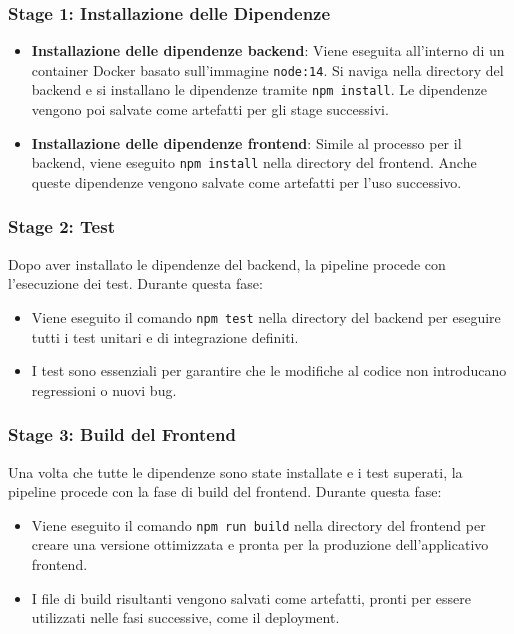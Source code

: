 \documentclass[twoside]{supsistudent}
\begin{document}
\subsubsection{Stage 1: Installazione delle Dipendenze}

\begin{itemize}
  \item \textbf{Installazione delle dipendenze backend}: Viene eseguita all'interno di un container Docker basato sull'immagine \texttt{node:14}. Si naviga nella directory del backend e si installano le dipendenze tramite \texttt{npm install}. Le dipendenze vengono poi salvate come artefatti per gli stage successivi.
  \item \textbf{Installazione delle dipendenze frontend}: Simile al processo per il backend, viene eseguito \texttt{npm install} nella directory del frontend. Anche queste dipendenze vengono salvate come artefatti per l'uso successivo.
\end{itemize}

\subsubsection{Stage 2: Test}

Dopo aver installato le dipendenze del backend, la pipeline procede con l'esecuzione dei test. Durante questa fase:

\begin{itemize}
  \item Viene eseguito il comando \texttt{npm test} nella directory del backend per eseguire tutti i test unitari e di integrazione definiti.
  \item I test sono essenziali per garantire che le modifiche al codice non introducano regressioni o nuovi bug.
\end{itemize}

\subsubsection{Stage 3: Build del Frontend}

Una volta che tutte le dipendenze sono state installate e i test superati, la pipeline procede con la fase di build del frontend. Durante questa fase:

\begin{itemize}
  \item Viene eseguito il comando \texttt{npm run build} nella directory del frontend per creare una versione ottimizzata e pronta per la produzione dell'applicativo frontend.
  \item I file di build risultanti vengono salvati come artefatti, pronti per essere utilizzati nelle fasi successive, come il deployment.
\end{itemize}
\end{document}
